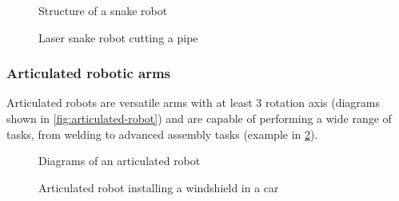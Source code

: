\begin{figure}[H]
	\begin{floatrow}[2]
		{\caption[Structure of a snake robot]{Structure of a snake robot\protect\footnotemark}\label{fig:snake-arm-robot-diagram}}

		{\caption[Laser snake robot cutting a pipe]{Laser snake robot cutting a pipe\protect\footnotemark}\label{fig:laser-snake-pipe-cutting}}
	\end{floatrow}
\end{figure}


\subsubsection{Articulated robotic arms}

Articulated robots are versatile arms with at least 3 rotation axis (diagrams shown in \cref{fig:articulated-robot}) and are capable of performing a wide range of tasks, from welding to advanced assembly tasks (example in \cref{fig:articulated-robot-kuka}).

\begin{figure}[H]
	\begin{floatrow}[2]
		{\caption[Diagrams of an articulated robot]{Diagrams of an articulated robot\protect\footnotemark}\label{fig:articulated-robot}}

		{\caption[Articulated  robot installing a windshield in a car]{Articulated  robot installing a windshield in a car\protect\footnotemark}\label{fig:articulated-robot-kuka}}
	\end{floatrow}
\end{figure}



